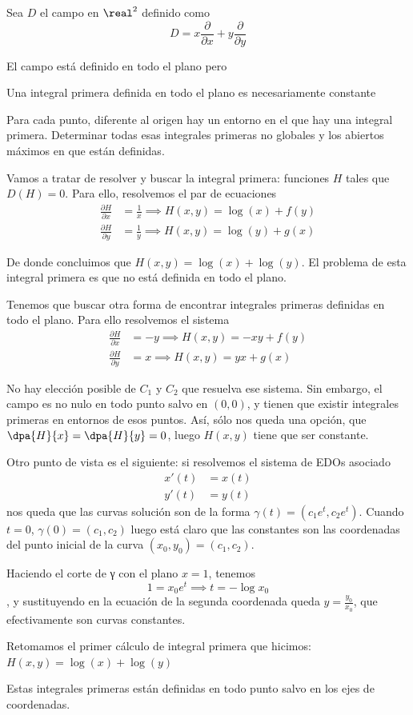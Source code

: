 \begin{problem}[2]
Sea $D$ el campo en $\real^2$ definido como
\[D=x \frac{\partial}{\partial x}+y \frac{\partial}{\partial y }\]

El campo está definido en todo el plano pero

\ppart Una integral primera definida en todo el plano es necesariamente constante

\ppart Para cada punto, diferente al origen hay un entorno en el que hay una integral primera. Determinar todas esas integrales primeras no globales y los abiertos máximos en que están definidas.
\solution


\yoP

\spart
Vamos a tratar de resolver y buscar la integral primera: funciones $H$ tales que $D(H) = 0$. Para ello, resolvemos el par de ecuaciones
\begin{align}
\frac{\partial H}{\partial x} &= \frac{1}{x} \implies H(x,y)=\log(x)+f(y)\\
\frac{\partial H}{\partial y} &= \frac{1}{y} \implies H(x,y)=\log(y)+g(x)
\end{align}

De donde concluimos que $H(x,y)=\log(x)+\log(y)$. El problema de esta integral primera es que no está definida en todo el plano.

Tenemos que buscar otra forma de encontrar integrales primeras definidas en todo el plano. Para ello resolvemos el sistema
\begin{align}
\frac{\partial H}{\partial x} &= -y \implies H(x,y)=-xy+f(y)\\
\frac{\partial H}{\partial y} &= x \implies H(x,y)=yx+g(x)
\end{align}

No hay elección posible de $C_1$ y $C_2$ que resuelva ese sistema. Sin embargo, el campo es no nulo en todo punto salvo en $(0,0)$, y tienen que existir integrales primeras en entornos de esos puntos. Así, sólo nos queda una opción, que $\dpa{H}{x} = \dpa{H}{y} = 0$, luego $H(x,y)$ tiene que ser constante.

Otro punto de vista es el siguiente: si resolvemos el sistema de EDOs asociado \begin{align*}
x'(t) &= x(t) \\
y'(t) &= y(t)
\end{align*} nos queda que las curvas solución son de la forma $γ(t) = (c_1e^t, c_2e^t)$. Cuando $t = 0$, $γ(0) = (c_1, c_2)$ luego está claro que las constantes son las coordenadas del punto inicial de la curva $(x_0, y_0) = (c_1, c_2)$.

Haciendo el corte de γ con el plano $x = 1$, tenemos \[ 1 = x_0e^t \implies t = - \log x_0 \], y sustituyendo en la ecuación de la segunda coordenada queda $y = \frac{y_0}{x_0}$, que efectivamente son curvas constantes.

\spart Retomamos el primer cálculo de integral primera que hicimos: $H(x,y)=\log(x)+\log(y)$

Estas integrales primeras están definidas en todo punto salvo en los ejes de coordenadas.

\end{problem}


